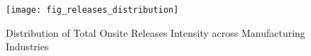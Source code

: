 \begin{figure}[H]
    \centering
    \texttt{[image: fig\_releases\_distribution]}
    \caption{Distribution of Total Onsite Releases Intensity across Manufacturing Industries}
    \label{fig:releases-distribution}
\end{figure}